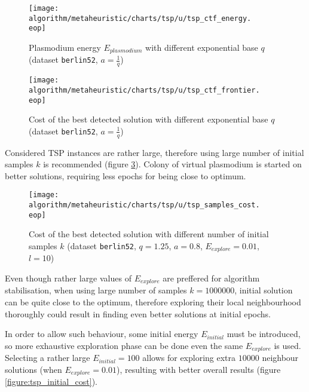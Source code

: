 \begin{figure}
  \centering

  \texttt{[image: algorithm/metaheuristic/charts/tsp/u/tsp\_ctf\_energy.\\eop]}

  \caption{Plasmodium energy $E_{plasmodium}$ with different exponential base $q$ (dataset \texttt{berlin52}, $a=\frac{1}{q}$)}
  \label{figure:tsp_ctf_energy}
\end{figure}

\begin{figure}
  \centering

  \texttt{[image: algorithm/metaheuristic/charts/tsp/u/tsp\_ctf\_frontier.\\eop]}

  \caption{Cost of the best detected solution with different exponential base $q$ (dataset \texttt{berlin52}, $a=\frac{1}{q}$)}
  \label{figure:tsp_ctf_frontier}
\end{figure}

Considered TSP instances are rather large, therefore using large number of initial samples $k$ is recommended (figure \ref{figure:tsp_samples_cost}). Colony of virtual plasmodium is started on better solutions, requiring less epochs for being close to optimum.

\begin{figure}
  \centering

  \texttt{[image: algorithm/metaheuristic/charts/tsp/u/tsp\_samples\_cost.\\eop]}

  \caption{Cost of the best detected solution with different number of initial samples $k$ (dataset \texttt{berlin52}, $q=1.25$, $a=0.8$, $E_{explore}=0.01$, $l=10$)}
  \label{figure:tsp_samples_cost}
\end{figure}

Even though rather large values of $E_{explore}$ are preffered for algorithm stabilisation, when using large number of samples $k=1000000$, initial solution can be quite close to the optimum, therefore exploring their local neighbourhood thoroughly could result in finding even better solutions at initial epochs. 

In order to allow such behaviour, some initial energy $E_{initial}$ must be introduced, so more exhaustive exploration phase can be done even the same $E_{explore}$ is used. Selecting a rather large $E_{initial}=100$ allows for exploring extra $10000$ neighbour solutions (when $E_{explore}=0.01$), resulting with better overall results (figure \ref{figure:tsp_initial_cost}).

